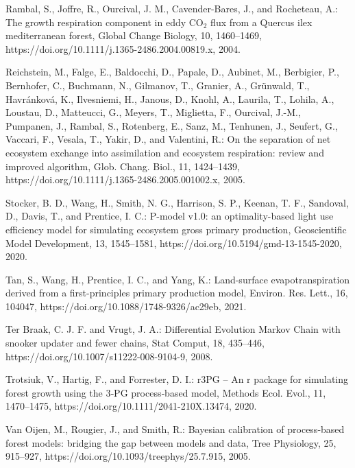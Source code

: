\documentclass[gmd, manuscript]{copernicus}
\begin{document}
\begin{thebibliography}{}
Rambal, S., Joffre, R., Ourcival, J. M., Cavender-Bares, J., and Rocheteau, A.: The growth respiration component in eddy CO$_2$ flux from a Quercus ilex mediterranean forest, Global Change Biology, 10, 1460–1469, https://doi.org/10.1111/j.1365-2486.2004.00819.x, 2004.

Reichstein, M., Falge, E., Baldocchi, D., Papale, D., Aubinet, M., Berbigier, P., Bernhofer, C., Buchmann, N., Gilmanov, T., Granier, A., Grünwald, T., Havránková, K., Ilvesniemi, H., Janous, D., Knohl, A., Laurila, T., Lohila, A., Loustau, D., Matteucci, G., Meyers, T., Miglietta, F., Ourcival, J.-M., Pumpanen, J., Rambal, S., Rotenberg, E., Sanz, M., Tenhunen, J., Seufert, G., Vaccari, F., Vesala, T., Yakir, D., and Valentini, R.: On the separation of net ecosystem exchange into assimilation and ecosystem respiration: review and improved algorithm, Glob. Chang. Biol., 11, 1424–1439, https://doi.org/10.1111/j.1365-2486.2005.001002.x, 2005.

Stocker, B. D., Wang, H., Smith, N. G., Harrison, S. P., Keenan, T. F., Sandoval, D., Davis, T., and Prentice, I. C.: P-model v1.0: an optimality-based light use efficiency model for simulating ecosystem gross primary production, Geoscientific Model Development, 13, 1545–1581, https://doi.org/10.5194/gmd-13-1545-2020, 2020.

Tan, S., Wang, H., Prentice, I. C., and Yang, K.: Land-surface evapotranspiration derived from a first-principles primary production model, Environ. Res. Lett., 16, 104047, https://doi.org/10.1088/1748-9326/ac29eb, 2021.

Ter Braak, C. J. F. and Vrugt, J. A.: Differential Evolution Markov Chain with snooker updater and fewer chains, Stat Comput, 18, 435–446, https://doi.org/10.1007/s11222-008-9104-9, 2008.

Trotsiuk, V., Hartig, F., and Forrester, D. I.: r3PG – An r package for simulating forest growth using the 3‐PG process‐based model, Methods Ecol. Evol., 11, 1470–1475, https://doi.org/10.1111/2041-210X.13474, 2020.

Van Oijen, M., Rougier, J., and Smith, R.: Bayesian calibration of process-based forest models: bridging the gap between models and data, Tree Physiology, 25, 915–927, https://doi.org/10.1093/treephys/25.7.915, 2005.


\end{thebibliography}
\end{document}
